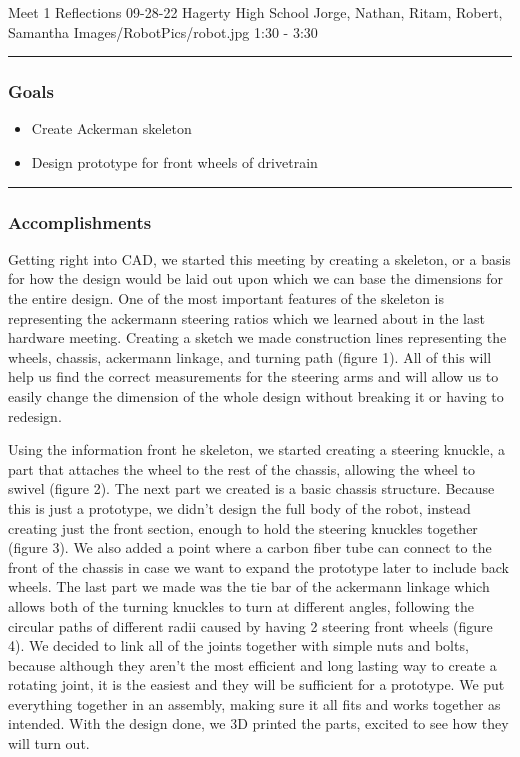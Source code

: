 \insertmeeting 
	{Meet 1 Reflections} 
	{09-28-22} 
	{Hagerty High School}
	{Jorge, Nathan, Ritam, Robert, Samantha}
	{Images/RobotPics/robot.jpg}
	{1:30 - 3:30}
	
\noindent\hfil\rule{\textwidth}{.4pt}\hfil
\subsubsection*{Goals}
\begin{itemize}
    \item Create Ackerman skeleton
    \item Design prototype for front wheels of drivetrain


\end{itemize} 

\noindent\hfil\rule{\textwidth}{.4pt}\hfil

\subsubsection*{Accomplishments}
Getting right into CAD, we started this meeting by creating a skeleton, or a basis for how the design would be laid out upon which we can base the dimensions for the entire design. One of the most important features of the skeleton is representing the ackermann steering ratios which we learned about in the last hardware meeting. Creating a sketch we made construction lines representing the wheels, chassis, ackermann linkage, and turning path (figure 1). All of this will help us find the correct measurements for the steering arms and will allow us to easily change the dimension of the whole design without breaking it or having to redesign.

Using the information front he skeleton, we started creating a steering knuckle, a part that attaches the wheel to the rest of the chassis, allowing the wheel to swivel (figure 2). The next part we created is a basic chassis structure. Because this is just a prototype, we didn’t design the full body of the robot, instead creating just the front section, enough to hold the steering knuckles together (figure 3). We also added a point where a carbon fiber tube can connect to the front of the chassis in case we want to expand the prototype later to include back wheels. The last part we made was the tie bar of the ackermann linkage which allows both of the turning knuckles to turn at different angles, following the circular paths of different radii caused by having 2 steering front wheels (figure 4). We decided to link all of the joints together with simple nuts and bolts, because although they aren't the most efficient and long lasting way to create a rotating joint, it is the easiest and they will be sufficient for a prototype. We put everything together in an assembly, making sure it all fits and works together as intended. With the design done, we 3D printed the parts, excited to see how they will turn out.

